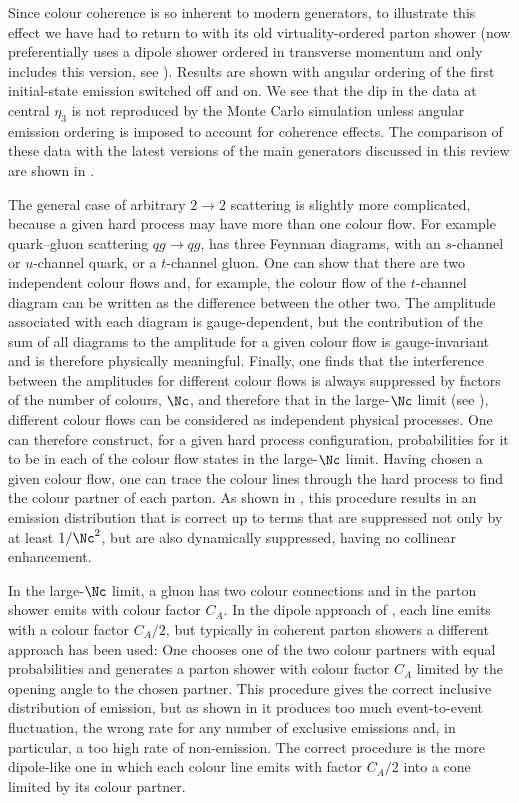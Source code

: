 Since colour coherence is so inherent to modern generators, to illustrate this
effect we have had to return to \pythiasix with its old virtuality-ordered
parton shower (\pythiasix now preferentially uses a dipole shower ordered in
transverse momentum and \pythiaeight only includes this version, see
).  Results are shown with angular ordering of the first
initial-state emission switched off and on.  We see
that the dip in the data at central $\eta_3$ is not reproduced by
the Monte Carlo simulation unless angular emission ordering is imposed to account for
coherence effects.  The comparison of these data with the latest versions of the
main generators discussed in this review are shown in
.

The general case of arbitrary $2\to2$ scattering is slightly more
complicated, because a given hard process may have more than one colour
flow.  For example quark--gluon scattering $qg\to qg$, has three Feynman
diagrams, with an $s$-channel or $u$-channel quark, or a $t$-channel
gluon.  One can show that there are two independent colour flows and,
for example, the colour flow of the $t$-channel diagram can be written
as the difference between the other two.  The amplitude associated with
each diagram is gauge-dependent, but the contribution of the sum of all
diagrams to the amplitude for a given colour flow is gauge-invariant and
is therefore physically meaningful.  Finally, one finds that the
interference between the amplitudes for different colour flows is always
suppressed by factors of the number of colours, $\Nc$, and therefore
that in the large-$\Nc$ limit (see ),
different colour flows can be considered
as independent physical processes.  One can therefore construct, for a
given hard process configuration, probabilities for it to be in each of
the colour flow states in the large-$\Nc$ limit.  Having chosen a given
colour flow, one can trace the colour lines through the hard process to
find the colour partner of each parton.  As shown in
\cite{Ellis:1986bv}, this procedure results in an emission
distribution that is correct up to terms that are suppressed not only by
at least $1/\Nc^2$, but are also dynamically suppressed, having no
collinear enhancement.

In the large-$\Nc$ limit, a gluon has two colour connections and in the
parton shower emits with colour factor $C_A$.  In the dipole approach of
, each line emits with a colour factor $C_A/2$, but
typically in coherent parton showers a different approach has been used:
One chooses one of the two colour partners with equal probabilities and
generates a parton shower with colour factor $C_A$ limited by the
opening angle to the chosen partner.  This procedure gives the correct
inclusive distribution of emission, but as shown in \cite{Schofield}
it produces too much event-to-event fluctuation,
the wrong rate for any number of exclusive emissions and, in particular,
a too high rate of non-emission.  The correct procedure is the more
dipole-like one in which each colour line emits with factor $C_A/2$ into
a cone limited by its colour partner.

